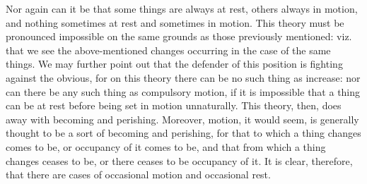 Nor again can it be that some things are always at rest, others always
in motion, and nothing sometimes at rest and sometimes in motion.
This theory must be pronounced impossible on the same grounds as those
previously mentioned: viz. that we see the above-mentioned changes
occurring in the case of the same things. We may further point out
that the defender of this position is fighting against the obvious,
for on this theory there can be no such thing as increase: nor can
there be any such thing as compulsory motion, if it is impossible
that a thing can be at rest before being set in motion unnaturally.
This theory, then, does away with becoming and perishing. Moreover,
motion, it would seem, is generally thought to be a sort of becoming
and perishing, for that to which a thing changes comes to be, or occupancy
of it comes to be, and that from which a thing changes ceases to be,
or there ceases to be occupancy of it. It is clear, therefore, that
there are cases of occasional motion and occasional rest.

